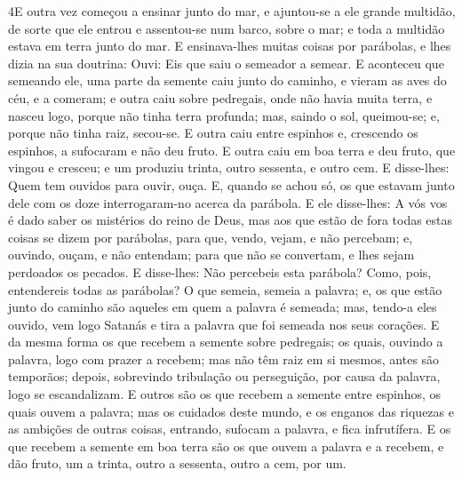 \lettrine{4} E outra vez começou a ensinar junto do mar, e
ajuntou-se a ele grande multidão, de sorte que ele entrou e
assentou-se num barco, sobre o mar; e toda a multidão estava em
terra junto do mar. E ensinava-lhes muitas coisas por parábolas,
e lhes dizia na sua doutrina: Ouvi: Eis que saiu o semeador a
semear. E aconteceu que semeando ele, uma parte da semente caiu
junto do caminho, e vieram as aves do céu, e a comeram; e outra
caiu sobre pedregais, onde não havia muita terra, e nasceu logo,
porque não tinha terra profunda; mas, saindo o sol, queimou-se;
e, porque não tinha raiz, secou-se. E outra caiu entre espinhos
e, crescendo os espinhos, a sufocaram e não deu fruto. E outra
caiu em boa terra e deu fruto, que vingou e cresceu; e um produziu
trinta, outro sessenta, e outro cem. E disse-lhes: Quem tem
ouvidos para ouvir, ouça. E, quando se achou só, os que
estavam junto dele com os doze interrogaram-no acerca da parábola.
E ele disse-lhes: A vós vos é dado saber os mistérios do
reino de Deus, mas aos que estão de fora todas estas coisas se dizem
por parábolas, para que, vendo, vejam, e não percebam; e,
ouvindo, ouçam, e não entendam; para que não se convertam, e lhes
sejam perdoados os pecados. E disse-lhes: Não percebeis esta
parábola? Como, pois, entendereis todas as parábolas? O que
semeia, semeia a palavra; e, os que estão junto do caminho
são aqueles em quem a palavra é semeada; mas, tendo-a eles ouvido,
vem logo Satanás e tira a palavra que foi semeada nos seus corações.
E da mesma forma os que recebem a semente sobre pedregais; os
quais, ouvindo a palavra, logo com prazer a recebem; mas não
têm raiz em si mesmos, antes são temporãos; depois, sobrevindo
tribulação ou perseguição, por causa da palavra, logo se
escandalizam. E outros são os que recebem a semente entre
espinhos, os quais ouvem a palavra; mas os cuidados deste
mundo, e os enganos das riquezas e as ambições de outras coisas,
entrando, sufocam a palavra, e fica infrutífera. E os que
recebem a semente em boa terra são os que ouvem a palavra e a
recebem, e dão fruto, um a trinta, outro a sessenta, outro a cem,
por um.

